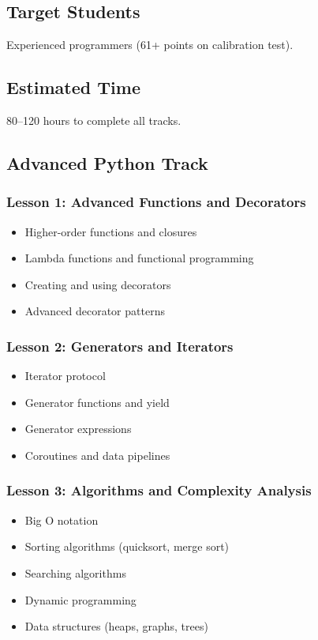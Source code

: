 \documentclass[11pt,letterpaper]{article}
\begin{document}
\subsection{Target Students}
Experienced programmers (61+ points on calibration test).

\subsection{Estimated Time}
80--120 hours to complete all tracks.

\subsection{Advanced Python Track}

\subsubsection{Lesson 1: Advanced Functions and Decorators}
\begin{itemize}[leftmargin=*]
    \item Higher-order functions and closures
    \item Lambda functions and functional programming
    \item Creating and using decorators
    \item Advanced decorator patterns
\end{itemize}

\subsubsection{Lesson 2: Generators and Iterators}
\begin{itemize}[leftmargin=*]
    \item Iterator protocol
    \item Generator functions and yield
    \item Generator expressions
    \item Coroutines and data pipelines
\end{itemize}

\subsubsection{Lesson 3: Algorithms and Complexity Analysis}
\begin{itemize}[leftmargin=*]
    \item Big O notation
    \item Sorting algorithms (quicksort, merge sort)
    \item Searching algorithms
    \item Dynamic programming
    \item Data structures (heaps, graphs, trees)
\end{itemize}
\end{document}
